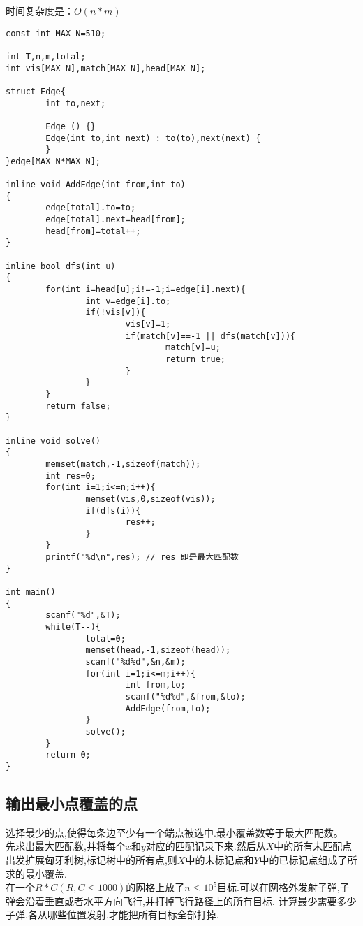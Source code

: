 时间复杂度是：$O(n*m)$
\begin{lstlisting}
const int MAX_N=510;

int T,n,m,total;
int vis[MAX_N],match[MAX_N],head[MAX_N];

struct Edge{
        int to,next;

        Edge () {}
        Edge(int to,int next) : to(to),next(next) {
        }
}edge[MAX_N*MAX_N];

inline void AddEdge(int from,int to)
{
        edge[total].to=to;
        edge[total].next=head[from];
        head[from]=total++;
}

inline bool dfs(int u)
{
        for(int i=head[u];i!=-1;i=edge[i].next){
                int v=edge[i].to;
                if(!vis[v]){
                        vis[v]=1;
                        if(match[v]==-1 || dfs(match[v])){
                                match[v]=u;
                                return true;
                        }
                }
        }
        return false;
}

inline void solve()
{
        memset(match,-1,sizeof(match));
        int res=0;
        for(int i=1;i<=n;i++){
                memset(vis,0,sizeof(vis));
                if(dfs(i)){
                        res++;
                }
        }
        printf("%d\n",res); // res 即是最大匹配数
}

int main()
{
        scanf("%d",&T);
        while(T--){
                total=0;
                memset(head,-1,sizeof(head));
                scanf("%d%d",&n,&m);
                for(int i=1;i<=m;i++){
                        int from,to;
                        scanf("%d%d",&from,&to);
                        AddEdge(from,to);
                }
                solve();
        }
        return 0;
}
\end{lstlisting}

\subsection{输出最小点覆盖的点}
选择最少的点,使得每条边至少有一个端点被选中.最小覆盖数等于最大匹配数。 \\
先求出最大匹配数,并将每个$x$和$y$对应的匹配记录下来.然后从$X$中的所有未匹配点出发扩展匈牙利树,标记树中的所有点,则$X$中的未标记点和$Y$中的已标记点组成了所求的最小覆盖.\\

在一个$R*C(R,C\leq 1000)$的网格上放了$n\leq 10^5$目标.可以在网格外发射子弹,子弹会沿着垂直或者水平方向飞行,并打掉飞行路径上的所有目标. 计算最少需要多少子弹,各从哪些位置发射,才能把所有目标全部打掉.\\

